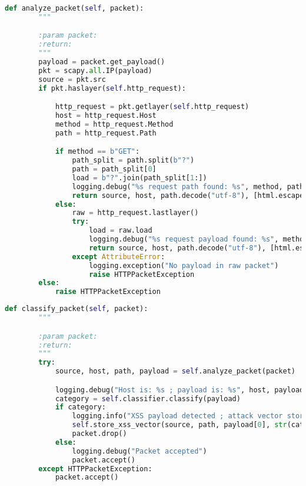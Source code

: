 \documentclass[10pt,journal,compsoc]{IEEEtran}
\begin{document}
\begin{lstlisting}[language=Python, caption={The analyze\_packet function, which strips out the payloyad from a packet.},
                                                label={lst:analyze}]
    def analyze_packet(self, packet):
        """

        :param packet:
        :return:
        """
        payload = packet.get_payload()
        pkt = scapy.all.IP(payload)
        source = pkt.src
        if pkt.haslayer(self.http_request):

            http_request = pkt.getlayer(self.http_request)
            host = http_request.Host
            method = http_request.Method
            path = http_request.Path

            if method == b"GET":
                path_split = path.split(b"?")
                path = path_split[0]
                load = b"?".join(path_split[1:])
                logging.debug("%s request path found: %s", method, path)
                return source, host, path.decode("utf-8"), [html.escape(unquote(unquote(load.decode("utf-8"))))]
            else:
                raw = http_request.lastlayer()
                try:
                    load = raw.load
                    logging.debug("%s request payload found: %s", method, load)
                    return source, host, path.decode("utf-8"), [html.escape(unquote(unquote(load.decode("utf-8"))))]
                except AttributeError:
                    logging.exception("No payload in raw packet")
                    raise HTTPPacketException
        else:
            raise HTTPPacketException

\end{lstlisting}


\begin{lstlisting}[language=Python, caption={The classify\_packet function, which passes a packet payload to the
                                                classifier and drops or accept the packet based on the
                                                returned verdict.}, label={lst:classify}]
    def classify_packet(self, packet):
        """

        :param packet:
        :return:
        """
        try:
            source, host, path, payload = self.analyze_packet(packet)

            logging.debug("Host is: %s ; payload is: %s", host, payload)
            category = self.classifier.classify(payload)
            if category:
                logging.info("XSS payload detected ; attack vector stored in DB and packet dropped")
                self.store_xss_vector(source, path, payload[0], str(category[0][0]))
                packet.drop()
            else:
                logging.debug("Packet accepted")
                packet.accept()
        except HTTPPacketException:
            packet.accept()

\end{lstlisting}
\end{document}
